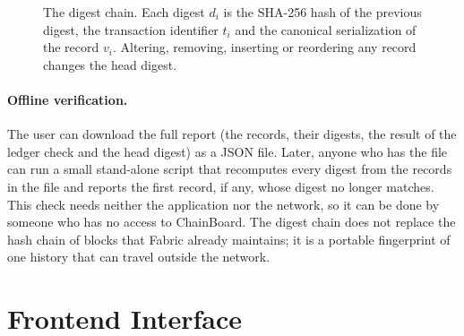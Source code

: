 \begin{figure}[tb]
    \centering
    \caption{The digest chain. Each digest $d_i$ is the SHA-256 hash of the previous digest, the transaction identifier $t_i$ and the canonical serialization of the record $v_i$. Altering, removing, inserting or reordering any record changes the head digest.}
    \label{fig:digest-chain}
\end{figure}

\paragraph*{Offline verification.} The user can download the full report (the records, their digests, the result of the ledger check and the head digest) as a JSON file. Later, anyone who has the file can run a small stand-alone script that recomputes every digest from the records in the file and reports the first record, if any, whose digest no longer matches. This check needs neither the application nor the network, so it can be done by someone who has no access to ChainBoard. The digest chain does not replace the hash chain of blocks that Fabric already maintains; it is a portable fingerprint of one history that can travel outside the network.

\section{Frontend Interface}
\label{sec:frontend}

